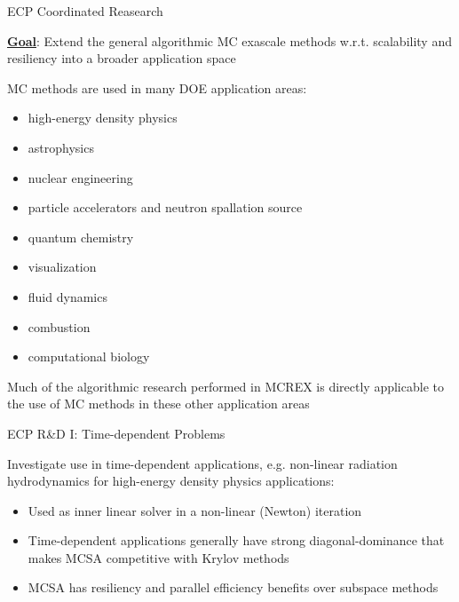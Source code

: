 \documentclass{beamer}
\begin{document}
\begin{frame}{ECP Coordinated Reasearch}

  \underline{\bf Goal}: Extend the general algorithmic MC exascale methods
  w.r.t. scalability and resiliency into a broader application space

  MC methods are used in many DOE application areas:
  \begin{itemize}
    \setlength{\itemsep}{-0.2\baselineskip}
  \item high-energy density physics
  \item astrophysics
  \item nuclear engineering
  \item particle accelerators and neutron spallation source
  \item quantum chemistry
  \item visualization
  \item fluid dynamics
  \item combustion
  \item computational biology
  \end{itemize}

  Much of the algorithmic research performed in MCREX is directly applicable
  to the use of MC methods in these other application areas

\end{frame}


\begin{frame}{ECP R\&D I: Time-dependent Problems}

  Investigate use in time-dependent applications, e.g. non-linear radiation
  hydrodynamics for high-energy density physics applications:
  \begin{itemize}
  \item Used as inner linear solver in a non-linear (Newton) iteration
  \item Time-dependent applications generally have strong diagonal-dominance
    that makes MCSA competitive with Krylov methods
  \item MCSA has resiliency and parallel efficiency benefits over subspace
    methods
  \end{itemize}

\end{frame}

\end{document}
